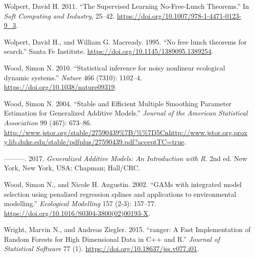 \documentclass[]{article}
\begin{document}
\leavevmode\hypertarget{ref-Wolpert2011}{}%
Wolpert, David H. 2011. ``The Supervised Learning No-Free-Lunch Theorems.'' In \emph{Soft Computing and Industry}, 25--42. \url{https://doi.org/10.1007/978-1-4471-0123-9_3}.

\leavevmode\hypertarget{ref-Wolpert1995}{}%
Wolpert, David H., and William G. Macready. 1995. ``No free lunch theorems for search.'' Santa Fe Institute. \url{https://doi.org/10.1145/1389095.1389254}.

\leavevmode\hypertarget{ref-Wood2010}{}%
Wood, Simon N. 2010. ``Statistical inference for noisy nonlinear ecological dynamic systems.'' \emph{Nature} 466 (7310): 1102--4. \url{https://doi.org/10.1038/nature09319}.

\leavevmode\hypertarget{ref-Wood2004}{}%
Wood, Simon N. 2004. ``Stable and Efficient Multiple Smoothing Parameter Estimation for Generalized Additive Models.'' \emph{Journal of the American Statistical Association} 99 (467): 673--86. \url{http://www.jstor.org/stable/27590439\%7B/\%\%7D5Cnhttp://www.jstor.org.proxy.lib.duke.edu/stable/pdfplus/27590439.pdf?acceptTC=true}.

\leavevmode\hypertarget{ref-Wood2017}{}%
---------. 2017. \emph{Generalized Additive Models: An Introduction with R}. 2nd ed. New York, New York, USA: Chapman; Hall/CRC.

\leavevmode\hypertarget{ref-Wood2002}{}%
Wood, Simon N., and Nicole H. Augustin. 2002. ``GAMs with integrated model selection using penalized regression splines and applications to environmental modelling.'' \emph{Ecological Modelling} 157 (2-3): 157--77. \url{https://doi.org/10.1016/S0304-3800(02)00193-X}.

\leavevmode\hypertarget{ref-Wright2015}{}%
Wright, Marvin N., and Andreas Ziegler. 2015. ``ranger: A Fast Implementation of Random Forests for High Dimensional Data in C++ and R.'' \emph{Journal of Statistical Software} 77 (1). \url{https://doi.org/10.18637/jss.v077.i01}.
\end{document}
